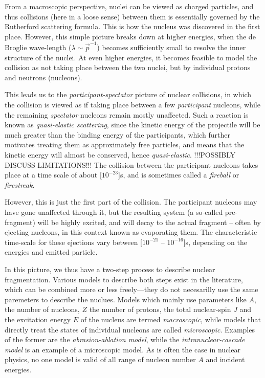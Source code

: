 From a macroscopic perspective, nuclei can be viewed as charged particles, and thus collisions (here in a loose sense) between them is essentially governed by the Rutherford scattering formula.
This is how the nucleus was discovered in the first place. However, this simple picture breaks down at higher energies, when the de Broglie wave-length ($\lambda \sim \vec{p}^{-1}$) becomes sufficiently small to resolve the inner structure of the nuclei. At even higher energies, it becomes feasible to model the collision as not taking place between the two nuclei, but by individual protons and neutrons (nucleons).

This leads us to the \emph{participant-spectator} picture of nuclear collisions, in which the collision is viewed as if taking place between a few \emph{participant} nucleons, while the remaining \emph{spectator} nucleons remain mostly unaffected. Such a reaction is known as \emph{quasi-elastic scattering}, since the kinetic energy of the projectile will be much greater than the binding energy of the participants, which further motivates treating them as approximately free particles, and means that the kinetic energy will almost be conserved, hence \emph{quasi-elastic}.
!!!POSSIBLY DISCUSS LIMITATIONS!!!
The collision between the participant nucleons takes place at a time scale of about \unit[$10^{-23}$]{s}\cite{gaimard:1991:art}, and is sometimes called a \emph{fireball} or \emph{firestreak}.

However, this is just the first part of the collision. The participant nucleons may have gone unaffected through it, but the resulting system (a so-called pre-fragment) will be highly excited, and will decay to the actual fragment -- often by ejecting nucleons, in this context known as evaporating them. The characteristic time-scale for these ejections vary between \unit[$10^{-21}$ -- $10^{-16}$]{s}, depending on the energies and emitted particle\cite{gaimard:1991:art}. 

In this picture, we thus have a two-step process to describe nuclear fragmentation. 
Various models to describe both steps exist in the literature, which can be combined more or less freely---they do not necesarilly use the same paremeters to describe the nuclues. Models which mainly use parameters like $A$, the number of nucleons, $Z$ the number of protons, the total nuclear-spin $J$ and the excitation energy $E$ of the nucleus are termed \emph{macroscopic}, while models that directly treat the states of individual nucleons are called \emph{microscopic}. Examples of the former are the \emph{abrasion-ablation model}\cite{bowman:1973:book}, while the \emph{intranuclear-cascade model}\cite{metropolis:1991:art} is an example of a microscopic model. As is often the case in nuclear physics, no one model is valid of all range of nucleon number $A$ and incident energies\cite{cucinotta:1998:art}.


